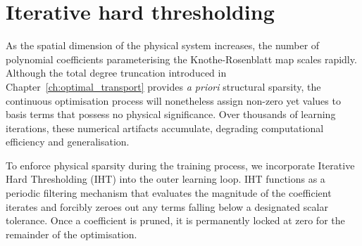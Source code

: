 \section{Iterative hard thresholding} \label{sec:iht}

As the spatial dimension of the physical system increases, the number of polynomial coefficients parameterising the Knothe-Rosenblatt map scales rapidly. Although the total degree truncation introduced in Chapter~\ref{ch:optimal_transport} provides \emph{a priori} structural sparsity, the continuous optimisation process will nonetheless assign non-zero yet values to basis terms that possess no physical significance. Over thousands of learning iterations, these numerical artifacts accumulate, degrading computational efficiency and generalisation.

To enforce physical sparsity during the training process, we incorporate Iterative Hard Thresholding (IHT) into the outer learning loop. IHT functions as a periodic filtering mechanism that evaluates the magnitude of the coefficient iterates and forcibly zeroes out any terms falling below a designated scalar tolerance. Once a coefficient is pruned, it is permanently locked at zero for the remainder of the optimisation.

